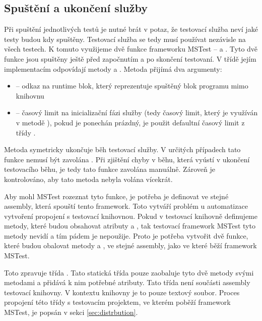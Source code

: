 \subsection{Spuštění a ukončení služby}

Při spuštění jednotlivých testů je nutné brát v potaz, že testovací služba neví jaké testy budou kdy spuštěny. Testovací služba se tedy musí používat nezávisle na všech testech. K tomuto využijeme dvě funkce frameworku MSTest --  a . Tyto dvě funkce jsou spuštěny ještě před započnutím a po skončení testovaní. V třídě  jejím implementacím odpovídají metody  a . Metoda  přijímá dva argumenty:

\begin{itemize}
    \item {} -- odkaz na runtime blok, který reprezentuje spuštěný blok programu mimo knihovnu
    \item {} -- časový limit na inicializační fázi služby (tedy časový limit, který je využíván v metodě ), pokud je ponechán prázdný, je použit defaultní časový limit z třídy .
\end{itemize}

Metoda  symetricky ukončuje běh testovací služby. V určitých případech tato funkce nemusí být zavolána . Při zjištění chyby v běhu, která vyústí v ukončení testovacího běhu, je tedy tato funkce zavolána manuálně. Zároveň je kontrolováno, aby tato metoda nebyla volána vícekrát.

Aby mohl MSTest rozeznat tyto funkce, je potřeba je definovat ve stejné assembly, která spouští tento framework. Toto vytváří problém u automatizace vytvoření propojení s testovací knihovnou. Pokud v testovací knihovně definujeme metody, které budou obsahovat atributy  a , tak testovací framework  MSTest tyto metody nevidí a tím pádem je nepoužije. Proto je potřeba vytvořit dvě funkce, které budou obalovat metody  a , ve stejné assembly, jako ve které běží framework MSTest.

Toto zpravuje třída . Tato statická třída pouze zaobaluje tyto dvě metody svými metodami a přidává k nim potřebné atributy. Tato třída není součásti assembly testovací knihovny. V kontextu knihovny je to pouze textový soubor. Proces propojení této třídy s testovacím projektem, ve kterém poběží framework MSTest, je popsán v sekci \ref{sec:distrbution}.

